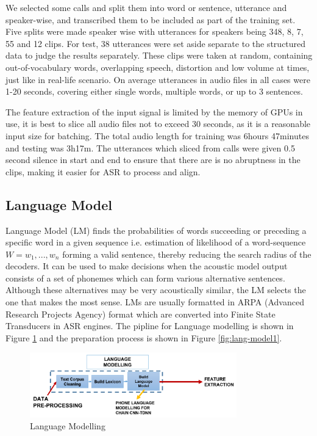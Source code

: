 \documentclass{article}
\begin{document}
We selected some calls and split them into word or sentence, utterance and speaker-wise, and transcribed them to be included as part of the training set. Five splits were made speaker wise with utterances for speakers being 348, 8, 7, 55 and 12 clips. For test, 38 utterances were set aside separate to the structured data to judge the results separately. These clips were taken at random, containing out-of-vocabulary words, overlapping speech, distortion and low volume at times, just like in real-life scenario. On average utterances in audio files in all cases were 1-20 seconds, covering either single words, multiple words, or up to 3 sentences.

 
The feature extraction of the input signal is limited by the memory of GPUs in use, it is best to slice all audio files not to exceed 30 seconds, as it is a reasonable input size for batching. The total audio length for training was 6hours 47minutes and testing was 3h17m. The utterances which sliced from calls were given 0.5  second silence in start and end to ensure that there are is no abruptness in the clips, making it easier for ASR to process and align.

\subsection{Language Model}
\label{sec:our_lang_modelling}

Language Model (LM) finds the probabilities of words succeeding or preceding a specific word in a given sequence i.e. estimation of likelihood of a word-sequence $W = w_{1},...,w_{n}$ forming a valid sentence, thereby reducing the search radius of the decoders. It can be used to make decisions when the acoustic model output consists of a set of phonemes which can form various alternative sentences. Although these alternatives may be very acoustically similar, the LM selects the one that makes the most sense. LMs are usually formatted in ARPA (Advanced Research Projects Agency) format which are converted into Finite State Transducers in ASR engines. The pipline for Language modelling is shown in Figure \ref{fig:working_pipeline-2} and the preparation process is shown in Figure \ref{fig:lang-model1}. 

\begin{figure}[h]
    \centering
    \includegraphics[width=0.8\textwidth]{img/workflow-2.png}
    \caption{Language Modelling}
    \label{fig:working_pipeline-2}
\end{figure}
\end{document}
